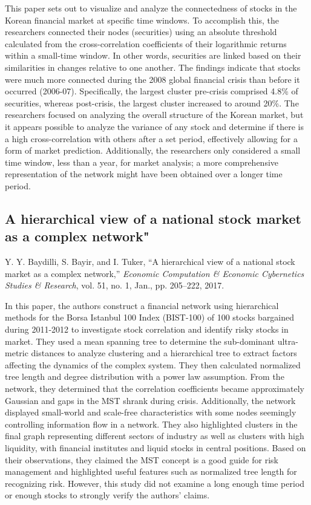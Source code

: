 \documentclass[12pt]{article}
\begin{document}
This paper sets out to visualize and analyze the connectedness of stocks in the Korean financial market at specific time windows. To accomplish this, the researchers connected their nodes (securities) using an absolute threshold calculated from the cross-correlation coefficients of their logarithmic returns within a small-time window. In other words, securities are linked based on their similarities in changes relative to one another. The findings indicate that stocks were much more connected during the 2008 global financial crisis than before it occurred (2006-07). Specifically, the largest cluster pre-crisis comprised 4.8\% of securities, whereas post-crisis, the largest cluster increased to around 20\%. The researchers focused on analyzing the overall structure of the Korean market, but it appears possible to analyze the variance of any stock and determine if there is a high cross-correlation with others after a set period, effectively allowing for a form of market prediction. Additionally, the researchers only considered a small time window, less than a year, for market analysis; a more comprehensive representation of the network might have been obtained over a longer time period.


\subsection{A hierarchical view of a national stock market as a complex network"}
Y. Y. Baydilli, S. Bayir, and I. Tuker, “A hierarchical view of a national stock market as a complex network,” \textit{Economic Computation \& Economic Cybernetics Studies \& Research}, vol. 51, no. 1, Jan., pp. 205–222, 2017.
\newline

In this paper, the authors construct a financial network using hierarchical methods for the Borsa Istanbul 100 Index (BIST-100) of 100 stocks bargained during 2011-2012 to investigate stock correlation and identify risky stocks in market. They used a mean spanning tree to determine the sub-dominant ultra-metric distances to analyze clustering and a hierarchical tree to extract factors affecting the dynamics of the complex system. They then calculated normalized tree length and degree distribution with a power law assumption. From the network, they determined that the correlation coefficients became approximately Gaussian and gaps in the MST shrank during crisis. Additionally, the network displayed small-world and scale-free characteristics with some nodes seemingly controlling information flow in a network. They also highlighted clusters in the final graph representing different sectors of industry as well as clusters with high liquidity, with financial institutes and liquid stocks in central positions. Based on their observations, they claimed the MST concept is a good guide for risk management and highlighted useful features such as normalized tree length for recognizing risk. However, this study did not examine a long enough time period or enough stocks to strongly verify the authors' claims.
\end{document}
